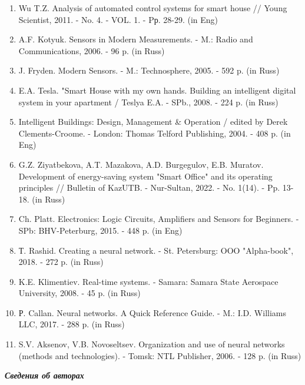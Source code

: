 \begin{enumerate}
\item
Wu T.Z. Analysis of automated control systems for smart house //
Young Scientist, 2011. - No. 4. - VOL. 1. - Pр. 28-29. (in Eng)

\item
A.F. Kotyuk. Sensors in Modern Measurements. - M.: Radio and
Communications, 2006. - 96 p. (in Russ)

\item
J. Fryden. Modern Sensors. - M.: Technosphere, 2005. - 592 p. (in
Russ)

\item
E.A. Tesla. "Smart House with my own hands. Building an intelligent
digital system in your apartment / Teslya E.A. - SPb., 2008. - 224 p.
(in Russ)

\item
Intelligent Buildings: Design, Management \& Operation / edited by
Derek Clements-Croome. - London: Thomas Telford Publishing, 2004. -
408 p. (in Eng)

\item
G.Z. Ziyatbekova, A.T. Mazakova, A.D. Burgegulov, E.B. Muratov.
Development of energy-saving system "Smart Office" and its operating
principles // Bulletin of KazUTB. - Nur-Sultan, 2022. - No. 1(14). -
Pp. 13-18. (in Russ)

\item
Ch. Platt. Electronics: Logic Circuits, Amplifiers and Sensors for
Beginners. - SPb: BHV-Peterburg, 2015. - 448 p. (in Eng)

\item
Т. Rashid. Creating a neural network. - St. Petersburg: OOO
"Alpha-book", 2018. - 272 p. (in Russ)

\item
K.E. Klimentiev. Real-time systems. - Samara: Samara State Aerospace
University, 2008. - 45 p. (in Russ)

\item
Р. Callan. Neural networks. A Quick Reference Guide. - M.: I.D.
Williams LLC, 2017. - 288 p. (in Russ)

\item
S.V. Aksenov, V.B. Novoseltsev. Organization and use of neural
networks (methods and technologies). - Tomsk: NTL Publisher, 2006. -
128 p. (in Russ)
\end{enumerate}

\emph{{\bfseries Сведения об авторах}}

